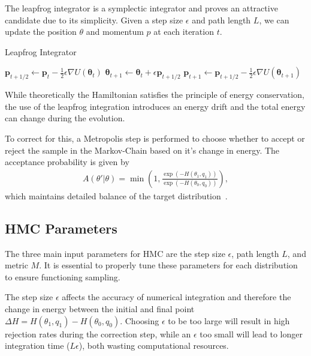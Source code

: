 \documentclass[11pt]{article}
\begin{document}
    The leapfrog integrator is a symplectic integrator and proves an attractive candidate due to its simplicity.
    Given a step size $\epsilon$ and path length $L$, we can update the position $\theta$ and momentum $p$ at each iteration $t$.
    \begin{algorithm}
    \caption{Leapfrog Integrator}
    \label{alg:leapfrog_integrator}
    \begin{algorithmic}
        \STATE {}
        \STATE $\mathbf{p}_{t+1/2} \gets \mathbf{p}_t - \frac{1}{2} \epsilon \nabla U(\mathbf{\theta}_t)$
        \STATE
        \STATE $ \mathbf{\theta}_{t+1} \gets \mathbf{\theta}_t + \epsilon \mathbf{p}_{t+1/2}$
        \STATE
        \STATE $ \mathbf{p}_{t+1} \gets \mathbf{p}_{t+1/2} - \frac{1}{2} \epsilon \nabla U(\mathbf{\theta}_{t+1})$
        \ENDFOR
    \end{algorithmic}
    \end{algorithm}

    While theoretically the Hamiltonian satisfies the principle of energy conservation, the use of the leapfrog
    integration introduces an energy drift and the total energy can change during the evolution.

    To correct for this, a Metropolis step is performed to choose whether to accept or reject the sample in
    the Markov-Chain based on it's change in energy.
    The acceptance probability is given by
    \begin{equation}\label{eq:hmc_accept_prob}
    \begin{aligned}
        A(\theta' | \theta) = \min \left(1, \frac{\exp(-H(\theta_1, q_1)) }{\exp(-H(\theta_0, q_0)) } \right),
    \end{aligned}
    \end{equation}
    which maintains detailed balance of the target distribution~\cite{betancourt2018conceptual}.

\subsection{HMC Parameters}\label{subsec:hmc_params}
    The three main input parameters for HMC are the step size $\epsilon$, path length $L$, and metric $M$.
    It is essential to properly tune these parameters for each distribution to ensure functioning sampling.

    The step size $\epsilon$ affects the accuracy of numerical integration and therefore the change in energy between the initial
    and final point $\Delta H = H(\theta_1, q_1) - H(\theta_0, q_0)$.
    Choosing $\epsilon$ to be too large will result in high rejection rates during the correction step,
    while an $\epsilon$ too small will lead to longer integration
    time ($L\epsilon$), both wasting computational resources.
\end{document}
